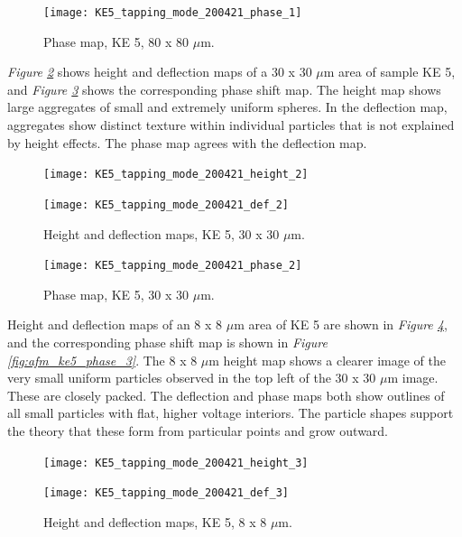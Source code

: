 \begin{figure}[H]
\centering
  \texttt{[image: KE5\_tapping\_mode\_200421\_phase\_1]}
\caption[Phase map, KE 5]{Phase map, KE 5, 80 x 80 $\mu$m.}
\label{fig:afm_ke5_phase_1}
\end{figure}

\textit{Figure \ref{fig:afm_ke5_height_def_2}} shows height and deflection maps of a 30 x 30 $\mu$m area of sample KE 5, and \textit{Figure \ref{fig:afm_ke5_phase_2}} shows the corresponding phase shift map. The height map shows large aggregates of small and extremely uniform spheres. In the deflection map, aggregates show distinct texture within individual particles that is not explained by height effects. The phase map agrees with the deflection map.

\begin{figure}[H]
\centering
\begin{minipage}{.45\textwidth}
  \centering
  \texttt{[image: KE5\_tapping\_mode\_200421\_height\_2]}
\end{minipage}
\begin{minipage}{.45\textwidth}
  \centering
  \texttt{[image: KE5\_tapping\_mode\_200421\_def\_2]}
\end{minipage}
\caption[Height and deflection maps, KE 5]{Height and deflection maps, KE 5, 30 x 30 $\mu$m.}
\label{fig:afm_ke5_height_def_2}
\end{figure}

\begin{figure}[H]
\centering
  \texttt{[image: KE5\_tapping\_mode\_200421\_phase\_2]}
\caption[Phase map, KE 5]{Phase map, KE 5, 30 x 30 $\mu$m.}
\label{fig:afm_ke5_phase_2}
\end{figure}

Height and deflection maps of an 8 x 8 $\mu$m area of KE 5 are shown in \textit{Figure \ref{fig:afm_ke5_height_def_3}}, and the corresponding phase shift map is shown in \textit{Figure \ref{fig:afm_ke5_phase_3}}. The 8 x 8 $\mu$m height map shows a clearer image of the very small uniform particles observed in the top left of the 30 x 30 $\mu$m image. These are closely packed. The deflection and phase maps both show outlines of all small particles with flat, higher voltage interiors. The particle shapes support the theory that these form from particular points and grow outward.

\begin{figure}[H]
\centering
\begin{minipage}{.45\textwidth}
  \centering
  \texttt{[image: KE5\_tapping\_mode\_200421\_height\_3]}
\end{minipage}
\begin{minipage}{.45\textwidth}
  \centering
  \texttt{[image: KE5\_tapping\_mode\_200421\_def\_3]}
\end{minipage}
\caption[Height and deflection maps, KE 5]{Height and deflection maps, KE 5, 8 x 8 $\mu$m.}
\label{fig:afm_ke5_height_def_3}
\end{figure}

